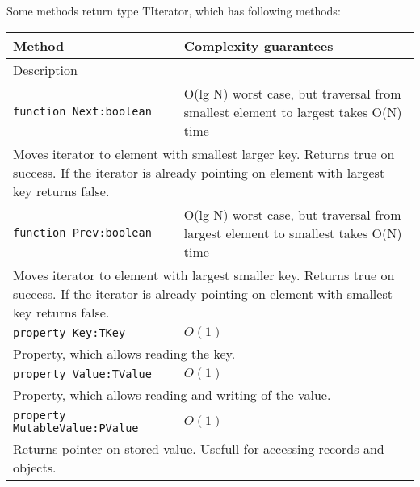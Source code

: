 Some methods return type TIterator, which has following methods:
\begin{longtable}{|m{10cm}|m{5cm}|}                                                             
\hline
Method & Complexity guarantees \\ \hline                                                  
\multicolumn{2}{|m{15cm}|}{Description} \\ \hline\hline                                               
\verb!function Next:boolean! & O(lg N) worst case, but traversal from smallest element to
largest takes O(N) time \\\hline
\multicolumn{2}{|m{15cm}|}{Moves iterator to element with smallest larger key. Returns true on
success. If the iterator is already pointing on element with largest key returns false.} \\\hline\hline

\verb!function Prev:boolean! & O(lg N) worst case, but traversal from largest element to
smallest takes O(N) time \\\hline
\multicolumn{2}{|m{15cm}|}{Moves iterator to element with largest smaller key. Returns true on
success. If the iterator is already pointing on element with smallest key returns false.} \\\hline\hline

\verb!property Key:TKey! & $O(1)$ \\\hline
\multicolumn{2}{|m{15cm}|}{Property, which allows reading the key.} \\\hline

\verb!property Value:TValue! & $O(1)$ \\\hline
\multicolumn{2}{|m{15cm}|}{Property, which allows reading and writing of the value.} \\\hline
\verb!property MutableValue:PValue! & $O(1)$ \\\hline
\multicolumn{2}{|m{15cm}|}{Returns pointer on stored value. Usefull for accessing records and
objects.} \\\hline


\end{longtable}
